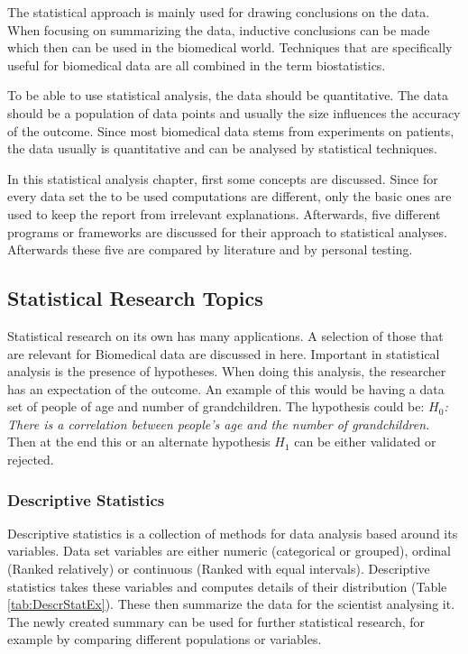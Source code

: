 \documentclass[10pt,a4paper]{report}
\begin{document}
	The statistical approach is mainly used for drawing conclusions on the 
	data. When focusing on summarizing the data, inductive conclusions can be 
	made which then can be used in the biomedical world. Techniques that are 
	specifically useful for biomedical data are all combined in the term 
	biostatistics.  \cite{woolson2011statistical} 
	
	To be able to use statistical analysis, the data should be quantitative. The data should be a population of data points and usually the size influences the accuracy of the outcome. Since most biomedical data stems from experiments on patients, the data usually is quantitative and can be analysed by statistical techniques.  \cite{sapsford2006data}
	
	In this statistical analysis chapter, first some concepts are discussed. 
	Since for every data set the to be used computations are different, only 
	the basic ones are used to keep the report from irrelevant explanations. 
	Afterwards, five different programs or frameworks are discussed for their 
	approach to statistical analyses. Afterwards these five are compared by 
	literature and by personal testing.
	
	\clearpage
	
	\subsection{Statistical Research Topics}
	
	Statistical research on its own has many applications. A selection of those 
	that are relevant for Biomedical data are discussed in here. Important in 
	statistical analysis is the presence of hypotheses. When doing this 
	analysis, the researcher has an expectation of the outcome. An example of 
	this would be having a data set of people of age and number of 
	grandchildren. The hypothesis could be: \textit{$H_0$: There is a 
		correlation between people's age and the number of grandchildren.} Then at 
	the end this or an alternate hypothesis $H_1$ can be either validated or 
	rejected. \cite{heiberger2004statistical}
	
	\subsubsection{Descriptive Statistics}
	
	Descriptive statistics is a collection of methods for data analysis based around its variables. Data set variables are either numeric (categorical or grouped), ordinal (Ranked relatively) or continuous (Ranked with equal intervals). Descriptive statistics takes these variables and computes details of their distribution (Table \ref{tab:DescrStatEx}).  \cite{FISHER200993} These then summarize the data for the scientist analysing it. The newly created summary can be used for further statistical research, for example by comparing different populations or variables.  \cite{woolson2011statistical}
	
\end{document}
